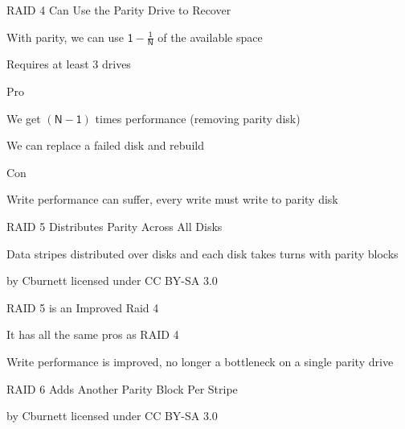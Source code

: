   \begin{frame}{RAID 4 Can Use the Parity Drive to Recover}

    With parity, we can use $\mathsf{1 - \frac{1}{N}}$ of the available space

    \hspace{2em} Requires at least 3 drives

    \vspace{2em}

    Pro

    \hspace{2em} We get $\mathsf{(N - 1)}$ times performance
                 (removing parity disk)

    \hspace{2em} We can replace a failed disk and rebuild

    \vspace{2em}

    Con

    \hspace{2em} Write performance can suffer, every write must write to parity
                 disk
  \end{frame}

  \begin{frame}{RAID 5 Distributes Parity Across All Disks}

    Data stripes distributed over disks and each disk takes turns with parity
    blocks
    \begin{center}
      
    \end{center}

    \begin{flushright}
      by Cburnett licensed under CC BY-SA 3.0
    \end{flushright}
  \end{frame}

  \begin{frame}{RAID 5 is an Improved Raid 4}

    It has all the same pros as RAID 4

    \vspace{2em}

    Write performance is improved, no longer a bottleneck on a single parity
    drive
  \end{frame}

  \begin{frame}{RAID 6 Adds Another Parity Block Per Stripe}
    \begin{center}
      
    \end{center}

    \begin{flushright}
      by Cburnett licensed under CC BY-SA 3.0
    \end{flushright}
  \end{frame}

